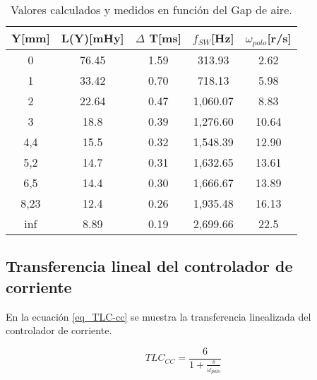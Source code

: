 \begin{table}[H]
	\begin{center}
		\begin{tabular}{| c | c | c | c | c |}
			\hline
			Y[mm] & L(Y)[mHy] & $\Delta$ T[ms] & $f_{SW}$[Hz] & $\omega _{polo}$[r/s]\\ \hline
			0 & 76.45 & 1.59 & 313.93 & 2.62\\ \hline
			1 & 33.42 & 0.70 & 718.13 & 5.98\\ \hline
			2 & 22.64 &	0.47 & 1,060.07 & 8.83\\ \hline
			3 &	18.8 & 0.39 & 1,276.60 & 10.64\\ \hline
			4,4 & 15.5 & 0.32 & 1,548.39 & 12.90\\ \hline
			5,2 & 14.7 & 0.31 & 1,632.65 & 13.61\\ \hline
			6,5 & 14.4 & 0.30 & 1,666.67 & 13.89\\ \hline
			8,23 & 12.4 & 0.26 & 1,935.48 & 16.13\\ \hline
			inf & 8.89 & 0.19 & 2,699.66 & 22.5	\\ \hline
		\end{tabular}
		\caption{Valores calculados y medidos en función del Gap de aire.}
		\label{tab_mediciones}
	\end{center}
\end{table}

\subsection{Transferencia lineal del controlador de corriente}

\noindent En la ecuación \ref{eq_TLC-cc} se muestra la transferencia linealizada del controlador de corriente.

\begin{equation} \label{eq_TLC-cc}
TLC_{CC} = \frac{6}{1+\frac{s}{\omega _{polo}}}
\end{equation}

